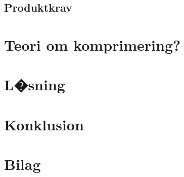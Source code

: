 \documentclass[12pt]{report}
\begin{document}
	
	\section{Produktkrav}
	
	\clearpage
	
	
\chapter{Teori om komprimering?}



\chapter{L�sning}



\chapter{Konklusion}



\begin{thebibliography}{99} %
 
\end{thebibliography}

\chapter*{Bilag}
\end{document}
